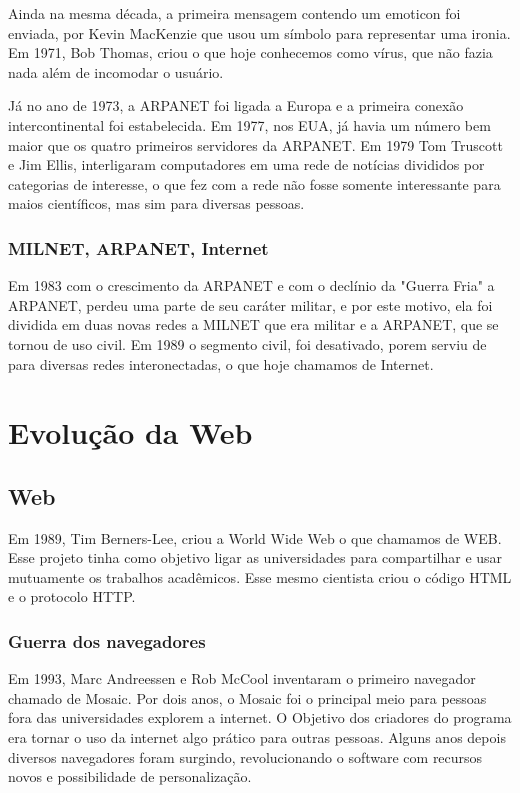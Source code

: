 \documentclass[
	12pt,				%
	openright,			%
	twoside,			%
	a4paper,			%
	Times,
	brazil,				%
	]{abntex2}
\begin{document}
Ainda na mesma década, a primeira mensagem contendo um emoticon foi enviada, por Kevin MacKenzie que usou um símbolo para representar uma ironia. Em 1971, Bob Thomas, criou o que hoje conhecemos como vírus, que não fazia nada além de incomodar o usuário. \cite{historia-internt}
\par

Já no ano de 1973, a ARPANET foi ligada a Europa e a primeira conexão intercontinental foi estabelecida. Em 1977, nos EUA, já havia um número bem maior que os quatro primeiros servidores da ARPANET. Em 1979 Tom Truscott e Jim Ellis, interligaram computadores em uma rede de notícias divididos por categorias de interesse, o que fez com a rede não fosse somente interessante para maios científicos, mas sim para diversas pessoas.  \cite{historia-internt}
\par


\subsubsection{MILNET, ARPANET, Internet}

Em 1983 com o crescimento da ARPANET e com o declínio da "Guerra Fria" a ARPANET, perdeu uma parte de seu caráter militar, e por este motivo, ela foi dividida em duas novas redes a MILNET que era militar e a ARPANET, que se tornou de uso civil. Em 1989 o segmento civil, foi desativado, porem serviu de para diversas redes interonectadas, o que hoje chamamos de Internet. \cite{historia-internt, web}
\par

\section{Evolução da Web}

\subsection{Web}

Em 1989, Tim Berners-Lee, criou a World Wide Web o que chamamos de WEB. Esse projeto tinha como objetivo ligar as universidades para compartilhar e usar mutuamente os trabalhos acadêmicos. Esse mesmo cientista criou o código HTML e o protocolo HTTP.  \cite{web}
\par

\subsubsection{Guerra dos navegadores}
Em 1993, Marc Andreessen e Rob McCool inventaram o primeiro navegador chamado de Mosaic. Por dois anos, o Mosaic foi o principal meio para pessoas fora das universidades explorem a internet. O Objetivo dos criadores do programa era tornar o uso da internet algo prático para outras pessoas. Alguns anos depois  diversos navegadores foram surgindo, revolucionando o software com recursos novos e possibilidade de personalização. \cite{web}
\par
\end{document}
